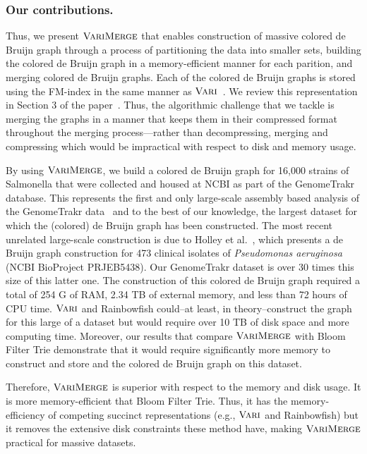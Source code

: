 \subsubsection{Our contributions.}  Thus, we present $\mbox{\rm {\sc VariMerge}}$ that enables construction of massive colored de Bruijn graph through a process of partitioning the data into smaller sets, building the colored de Bruijn graph in a memory-efficient manner for each parition, and merging colored de Bruijn graphs. Each of the colored de Bruijn graphs is stored using the FM-index in the same manner as $\mbox{\rm {\sc Vari}}$~\cite{vari}.  We review this representation in Section 3 of the paper~\cite{BOSS12}.  Thus, the algorithmic challenge that we tackle is merging the graphs in a manner that keeps them in their compressed format throughout the merging process---rather than decompressing, merging and compressing which would be impractical with respect to disk and memory usage.




By using $\mbox{\rm {\sc VariMerge}}$, we build a colored de Bruijn graph for 16,000 strains of Salmonella that were collected and housed at NCBI as part of the GenomeTrakr database.  This represents the first and only large-scale assembly based analysis of the GenomeTrakr data~\cite{pettengill2016} and to the best of our knowledge, the largest dataset for which the (colored) de Bruijn graph has been constructed.  The most recent unrelated large-scale construction is due to  Holley et al.~\cite{holley2015bloom}, which presents a de Bruijn graph construction for 473 clinical isolates of {\em Pseudomonas aeruginosa} (NCBI BioProject PRJEB5438).  Our GenomeTrakr dataset is over 30 times this size of this latter one.   The construction of this colored de Bruijn graph required a total of 254 G of RAM, 2.34 TB of external memory, and less than 72 hours of CPU time.  $\mbox{\rm {\sc Vari}}$ and Rainbowfish could--at least, in theory--construct the graph for this large of a dataset but would require over 10 TB of disk space and more computing time.  Moreover, our results that compare $\mbox{\rm {\sc VariMerge}}$ with Bloom Filter Trie demonstrate that it would require significantly more memory to construct and store and the colored de Bruijn graph on this dataset.

Therefore, $\mbox{\rm {\sc VariMerge}}$ is superior with respect to the memory and disk usage.  It is more memory-efficient that Bloom Filter Trie.   Thus, it has the memory-efficiency of competing succinct representations (e.g., $\mbox{\rm {\sc Vari}}$ and Rainbowfish) but it removes the extensive disk constraints these method have, making $\mbox{\rm {\sc VariMerge}}$ practical for massive datasets.







